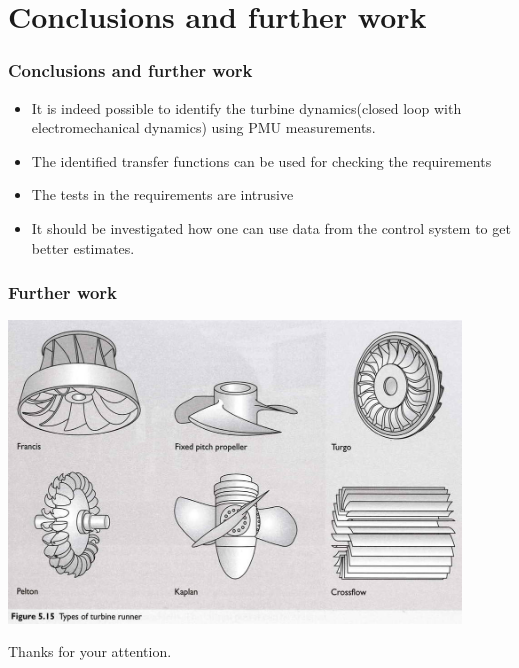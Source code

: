 \section{Conclusions and further work}
\begin{frame}
		\frametitle{Conclusions and further work}
	\begin{itemize}
		\item It is indeed possible to identify the turbine dynamics(closed loop with electromechanical dynamics) using PMU measurements.
		\item The identified transfer functions can be used for checking the requirements
		\item The tests in the requirements are intrusive
		\item It should be investigated how one can use data from the control system to get better estimates.
	\end{itemize}
\end{frame}
\begin{frame}
	\frametitle{Further work}
	\includegraphics[width=0.9\textwidth]{./pictures/turbines.png}
	\end{frame}
\begin{frame}
		\begin{center}
		\Huge	Thanks for your attention.
\end{center}
\end{frame}
